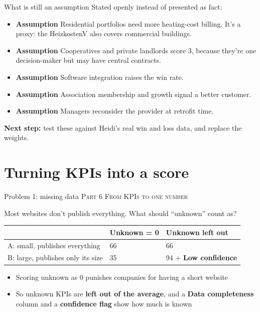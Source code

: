 \documentclass[aspectratio=169,11pt]{beamer}
\newcommand{\as}{\textcolor{assume}{\textbf{Assumption}}}
\newcommand{\partlabel}[1]{{\small\color{assume}\textsc{#1}}\par\vspace{0.3em}}
\begin{document}
\begin{frame}{What is still an assumption}
  Stated openly instead of presented as fact:
  \begin{itemize}
    \item \as{} Residential portfolios need more heating-cost billing. It's a proxy: the
          HeizkostenV also covers commercial buildings.
    \item \as{} Cooperatives and private landlords score 3, because they're one decision-maker
          but may have central contracts.
    \item \as{} Software integration raises the win rate.
    \item \as{} Association membership and growth signal a better customer.
    \item \as{} Managers reconsider the provider at retrofit time.
  \end{itemize}
  \vspace{0.6em}
  \textbf{Next step:} test these against Heidi's real win and loss data, and replace the weights.
\end{frame}

\section{Turning KPIs into a score}

\begin{frame}{Problem 1: missing data}
  \partlabel{Part 6 \textbullet{} From KPIs to one number}
  Most websites don't publish everything. What should ``unknown'' count as?
  \vspace{0.4em}

  \small
  \begin{tabular}{@{}p{5.2cm} p{3.6cm} p{3.6cm}@{}}
    \toprule
    & \textbf{Unknown = 0} & \textbf{Unknown left out} \\
    \midrule
    A: small, publishes everything & 66 & 66 \\
    B: large, publishes only its size & \textcolor{bad}{35} & 94 + \textbf{Low confidence} \\
    \bottomrule
  \end{tabular}
  \vspace{0.6em}

  \normalsize
  \begin{itemize}
    \item Scoring unknown as 0 punishes companies for having a short website
    \item So unknown KPIs are \textbf{left out of the average}, and a \textbf{Data
          completeness} column and a \textbf{confidence flag} show how much is known
  \end{itemize}
\end{frame}
\end{document}
